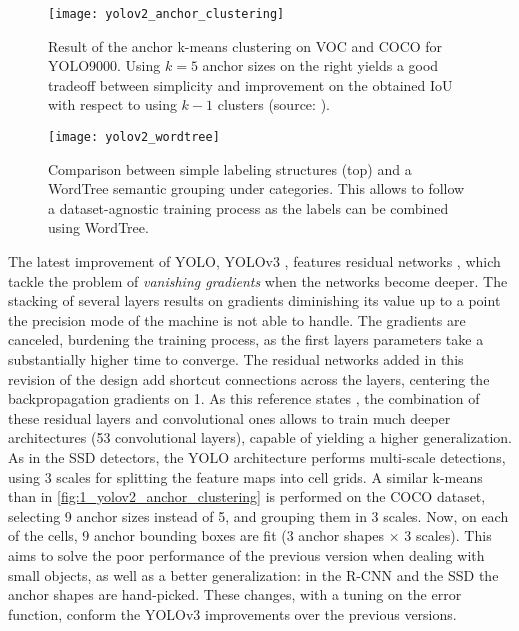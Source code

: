 \begin{figure}[h]
	\centering
	\texttt{[image: yolov2\_anchor\_clustering]}
	\caption{Result of the anchor k-means clustering on VOC and COCO for YOLO9000. Using $k=5$ anchor sizes on the right yields a good tradeoff between simplicity and improvement on the obtained IoU with respect to using $k-1$ clusters (source: \cite{yolov2}).}
	\label{fig:1_yolov2_anchor_clustering}
\end{figure}
\vspace{8cm}
\begin{figure}[h]
	\centering
	\texttt{[image: yolov2\_wordtree]}
	\caption{Comparison between simple labeling structures (top) and a WordTree semantic grouping under categories. This allows to follow a dataset-agnostic training process as the labels can be combined using WordTree.}
	\label{fig:1_yolov2_wordtree}
\end{figure}




The latest improvement of YOLO, YOLOv3 \cite{yolov3}, features residual networks \cite{resnets}, which tackle the problem of \textit{vanishing gradients} when the networks become deeper. The stacking of several layers results on gradients diminishing its value up to a point the precision mode of the machine is not able to handle. The gradients are canceled, burdening the training process, as the first layers parameters take a substantially higher time to converge. The residual networks added in this revision of the design add shortcut connections across the layers, centering the backpropagation gradients on 1. As this reference states \cite{yolov3}, the combination of these residual layers and convolutional ones allows to train much deeper architectures (53 convolutional layers), capable of yielding a higher generalization. As in the SSD detectors, the YOLO architecture performs multi-scale detections, using 3 scales for splitting the feature maps into cell grids. A similar k-means than in \autoref{fig:1_yolov2_anchor_clustering} is performed on the COCO dataset, selecting 9 anchor sizes instead of 5, and grouping them in 3 scales. Now, on each of the cells, 9 anchor bounding boxes are fit (3 anchor shapes $\times$ 3 scales). This aims to solve the poor performance of the previous version when dealing with small objects, as well as a better generalization: in the R-CNN \cite{rcnn} and the SSD \cite{ssd} the anchor shapes are hand-picked. These changes, with a tuning on the error function, conform the YOLOv3 improvements over the previous versions.\\

